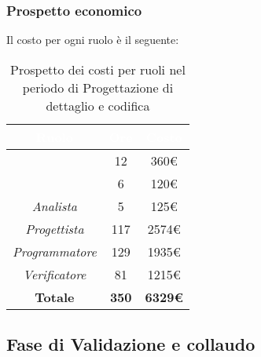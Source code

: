 \subsubsection{Prospetto economico}
Il costo per ogni ruolo è il seguente:
\begin{table}[H]
	\begin{center}
		\begin{tabular}{ c c c }
		\rowcolor{darkblue} 
		\textcolor{white}{\textbf{Ruolo}} & \textcolor{white}{\textbf{Ore}} & \textcolor{white}{\textbf{Costo}} \\ \hline
		\textit{\Responsabile} & 12 & 360€ \\ \hline
		\textit{\Amministratore} & 6 & 120€ \\ \hline
		\textit{Analista} & 5 & 125€ \\ \hline
		\textit{Progettista} & 117 & 2574€ \\ \hline
		\textit{Programmatore}  & 129 & 1935€ \\ \hline
		\textit{Verificatore} & 81 & 1215€ \\ \hline
		\textbf{Totale} & \textbf{350} & \textbf{6329€} \\ \hline
		\end{tabular}
	\caption{ Prospetto dei costi per ruoli nel periodo di Progettazione di dettaglio e codifica}
	\end{center}
\end{table}

\subsection{Fase di Validazione e collaudo}
